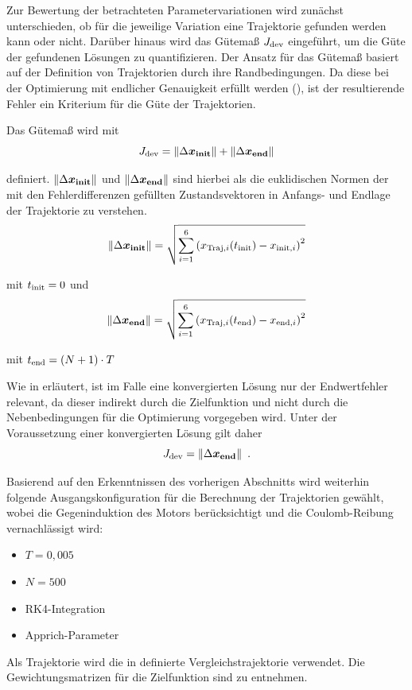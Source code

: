 Zur Bewertung der betrachteten Parametervariationen wird zunächst unterschieden, ob für die jeweilige Variation eine Trajektorie gefunden werden kann oder nicht. Darüber hinaus wird das Gütemaß $J_{\mathrm{dev}}$ eingeführt, um die Güte der gefundenen Lösungen zu quantifizieren. Der Ansatz für das Gütemaß basiert auf der Definition von Trajektorien durch ihre Randbedingungen. Da diese bei der Optimierung mit endlicher Genauigkeit erfüllt werden (\vgl {}), ist der resultierende Fehler ein Kriterium für die Güte der Trajektorien.

Das Gütemaß wird mit
	\[
	J_{\mathrm{dev}} = \left\| \Delta \boldsymbol{x_{\mathrm{init}}} \right\| + \left\| \Delta \boldsymbol{x_{\mathrm{end}}} \right\|
	\]
	
definiert. $\left\|\Delta \boldsymbol{x_{\mathrm{init}}}\right\|$ und $\left\|\Delta \boldsymbol{x_{\mathrm{end}}}\right\|$ sind hierbei als die euklidischen Normen der mit den Fehlerdifferenzen gefüllten Zustandsvektoren in Anfangs- und Endlage der Trajektorie zu verstehen.
\[
	\left\| \Delta \boldsymbol{x_{\mathrm{init}}} \right\| = \sqrt{ \sum_{i=1}^6 \left( x_{\mathrm{Traj,}i}(t_{\mathrm{init}}) - x_{\mathrm{init,}i} \right)^2 }
\]

mit $t_{\mathrm{init}} = 0$ und
	\[
	\left\| \Delta \boldsymbol{x_{\mathrm{end}}} \right\| = \sqrt{ \sum_{i=1}^6 \left( x_{\mathrm{Traj,}i}(t_{\mathrm{end}}) - x_{\mathrm{end,}i} \right)^2 }
\]

mit $t_{\mathrm{end}} = (N+1) \cdot T$

Wie in  erläutert, ist im Falle eine konvergierten Lösung nur der Endwertfehler relevant, da dieser indirekt durch die Zielfunktion und nicht durch die Nebenbedingungen für die Optimierung vorgegeben wird. Unter der Voraussetzung einer konvergierten Lösung gilt daher
\[
	J_{\mathrm{dev}} = \left\| \Delta \boldsymbol{x_{\mathrm{end}}} \right\| \ .
	\]	 

Basierend auf den Erkenntnissen des vorherigen Abschnitts wird weiterhin folgende Ausgangskonfiguration für die Berechnung der Trajektorien gewählt, wobei die Gegeninduktion des Motors berücksichtigt und die Coulomb-Reibung vernachlässigt wird:
\begin{itemize}
	\item $T = 0,005$
	\item $N = 500$
	\item RK4-Integration
	\item Apprich-Parameter
\end{itemize}

Als Trajektorie wird die in  definierte Vergleichstrajektorie verwendet. Die Gewichtungsmatrizen für die Zielfunktion sind  zu entnehmen.






